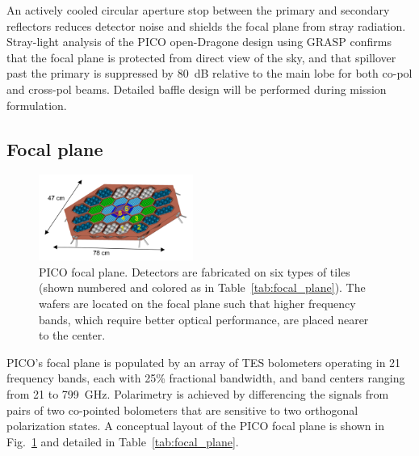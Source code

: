 An actively cooled circular aperture stop between the primary and secondary reflectors reduces detector noise and shields the focal plane from stray radiation. Stray-light analysis of the PICO open-Dragone design using GRASP confirms that the focal plane is protected from direct view of the sky, and that spillover past the primary is suppressed by 80~dB relative to the main lobe for both co-pol and cross-pol beams. Detailed baffle design will be performed during mission formulation.



\subsection{Focal plane}
\label{sec:focal_plane} %
%
\begin{figure}
\vskip -8pt
\hfill
\includegraphics[width=0.45\textwidth]{figures/FocalPlaneMechanical.png}
\vskip -2pt
\caption{\captiontext PICO focal plane. Detectors are fabricated on six types of tiles (shown numbered and colored as in Table~\ref{tab:focal_plane}). The wafers are located on the focal plane such that higher frequency bands, which require better optical performance, are placed nearer to the center.\label{fig:FocalPlaneMechanical}}
\end{figure}


PICO's focal plane is populated by an %
array of \ac{TES} bolometers operating in 21 %
frequency bands, each with 25\% fractional bandwidth, and band centers ranging from 21 to 799~GHz.
Polarimetry is achieved by differencing the signals from pairs of two co-pointed bolometers that are sensitive to two orthogonal polarization states. %
A conceptual layout of the PICO focal plane is shown in Fig.~\ref{fig:FocalPlaneMechanical} and detailed in Table~\ref{tab:focal_plane}.

